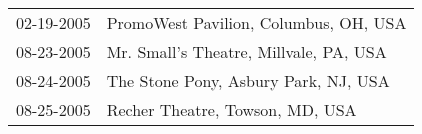 \begin{supertabular}{ll}
 02-19-2005 &   PromoWest Pavilion, Columbus, OH, USA \\
 08-23-2005 &  Mr. Small's Theatre, Millvale, PA, USA \\
 08-24-2005 &    The Stone Pony, Asbury Park, NJ, USA \\
 08-25-2005 &         Recher Theatre, Towson, MD, USA \\
\end{supertabular}
